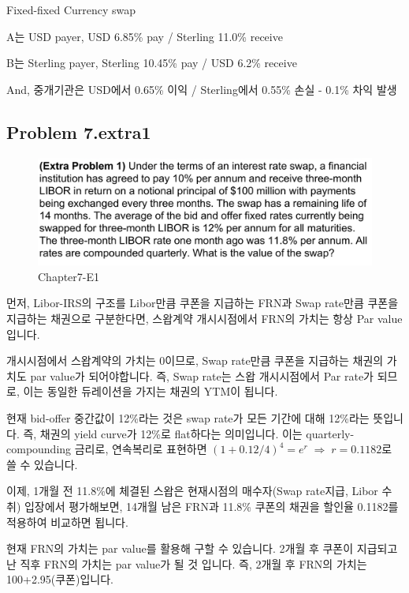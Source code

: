 \documentclass[
  letterpaper,
  DIV=11,
  numbers=noendperiod]{scrreprt}
\begin{document}
Fixed-fixed Currency swap

A는 USD payer, USD 6.85\% pay / Sterling 11.0\% receive

B는 Sterling payer, Sterling 10.45\% pay / USD 6.2\% receive

And, 중개기관은 USD에서 0.65\% 이익 / Sterling에서 0.55\% 손실 - 0.1\%
차익 발생

\subsection*{\texorpdfstring{\textbf{Problem
7.extra1}}{Problem 7.extra1}}\label{problem-7.extra1}

\begin{figure}[H]

{\centering \includegraphics{images/선물옵션_7-extra1.png}

}

\caption{Chapter7-E1}

\end{figure}%

먼저, Libor-IRS의 구조를 Libor만큼 쿠폰을 지급하는 FRN과 Swap rate만큼
쿠폰을 지급하는 채권으로 구분한다면, 스왑계약 개시시점에서 FRN의 가치는
항상 Par value입니다.

개시시점에서 스왑계약의 가치는 0이므로, Swap rate만큼 쿠폰을 지급하는
채권의 가치도 par value가 되어야합니다. 즉, Swap rate는 스왑
개시시점에서 Par rate가 되므로, 이는 동일한 듀레이션을 가지는 채권의
YTM이 됩니다.

현재 bid-offer 중간값이 12\%라는 것은 swap rate가 모든 기간에 대해
12\%라는 뜻입니다. 즉, 채권의 yield curve가 12\%로 flat하다는
의미입니다. 이는 quarterly-compounding 금리로, 연속복리로 표현하면
\((1+0.12/4)^4=e^r\;\Rightarrow\;r=0.1182\)로 쓸 수 있습니다.

이제, 1개월 전 11.8\%에 체결된 스왑은 현재시점의 매수자(Swap rate지급,
Libor 수취) 입장에서 평가해보면, 14개월 남은 FRN과 11.8\% 쿠폰의 채권을
할인율 0.1182를 적용하여 비교하면 됩니다.

현재 FRN의 가치는 par value를 활용해 구할 수 있습니다. 2개월 후 쿠폰이
지급되고 난 직후 FRN의 가치는 par value가 될 것 입니다. 즉, 2개월 후
FRN의 가치는 100+2.95(쿠폰)입니다.
\end{document}
